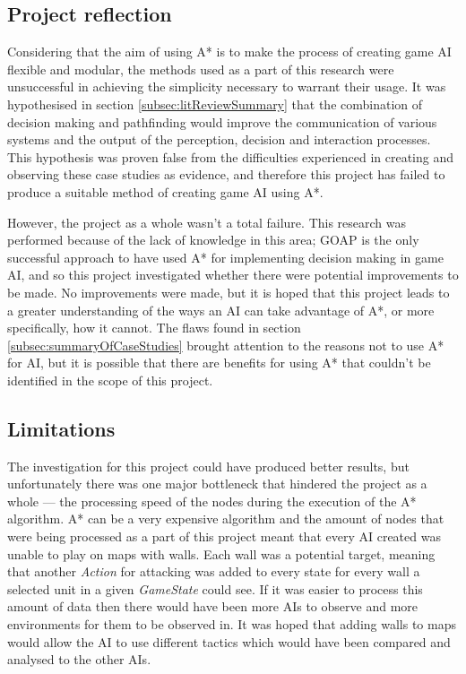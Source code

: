 \documentclass[11pt, a4paper]{report}
\begin{document}
\subsection{Project reflection}
\label{subsec:projectReflection}

Considering that the aim of using A* is to make the process of creating game AI flexible and modular, the methods used as a part of this research were unsuccessful in achieving the simplicity necessary to warrant their usage. It was hypothesised in section \ref{subsec:litReviewSummary} that the combination of decision making and pathfinding would improve the communication of various systems and the output of the perception, decision and interaction processes. This hypothesis was proven false from the difficulties experienced in creating and observing these case studies as evidence, and therefore this project has failed to produce a suitable method of creating game AI using A*.

However, the project as a whole wasn't a total failure. This research was performed because of the lack of knowledge in this area; GOAP is the only successful approach to have used A* for implementing decision making in game AI, and so this project investigated whether there were potential improvements to be made. No improvements were made, but it is hoped that this project leads to a greater understanding of the ways an AI can take advantage of A*, or more specifically, how it cannot. The flaws found in section \ref{subsec:summaryOfCaseStudies} brought attention to the reasons not to use A* for AI, but it is possible that there are benefits for using A* that couldn't be identified in the scope of this project.

\subsection{Limitations}
\label{subsec:limitations}

The investigation for this project could have produced better results, but unfortunately there was one major bottleneck that hindered the project as a whole --- the processing speed of the nodes during the execution of the A* algorithm. A* can be a very expensive algorithm and the amount of nodes that were being processed as a part of this project meant that every AI created was unable to play on maps with walls. Each wall was a potential target, meaning that another \emph{Action} for attacking was added to every state for every wall a selected unit in a given \emph{GameState} could see. If it was easier to process this amount of data then there would have been more AIs to observe and more environments for them to be observed in. It was hoped that adding walls to maps would allow the AI to use different tactics which would have been compared and analysed to the other AIs. 
\end{document}
